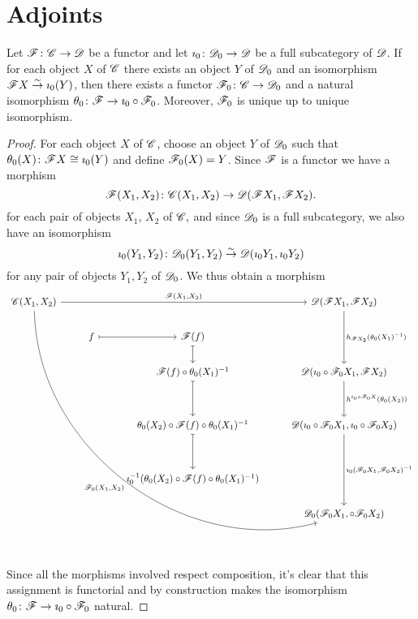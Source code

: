 \documentclass[10pt]{amsart}
\begin{document}
\section{Adjoints}

\begin{lem}\label{factorization}
  Let $\mathscr{F} \colon \mathscr{C} \to \mathscr{D}$ be a functor and let $\imath_0 \colon \mathscr{D}_0 \to \mathscr{D}$ be a full subcategory of $\mathscr{D}$.
  If for each object $X$ of $\mathscr{C}$ there exists an object $Y$ of $\mathscr{D}_0$ and an isomorphism $\mathscr{F} X \overset{\sim}\to \imath_0(Y)$, then there exists a functor $\mathscr{F}_0 \colon \mathscr{C} \to \mathscr{D}_0$ and a natural isomorphism $\theta_0 \colon \mathscr{F} \to \imath_0 \circ \mathscr{F}_0$.
  Moreover, $\mathscr{F}_0$ is unique up to unique isomorphism.
  
  \begin{proof}
    For each object $X$ of $\mathscr{C}$, choose an object $Y$ of $\mathscr{D}_0$ such that $\theta_0(X) \colon \mathscr{F} X \cong \imath_0(Y)$ and define $\mathscr{F}_0(X) = Y$.
    Since $\mathscr{F}$ is a functor we have a morphism 
    $$\mathscr{F}(X_1,X_2) \colon \mathscr{C}(X_1,X_2) \to \mathscr{D}(\mathscr{F} X_1, \mathscr{F} X_2).$$
    for each pair of objects $X_1$, $X_2$ of $\mathscr{C},$
    and since $\mathscr{D}_0$ is a full subcategory, we also have an isomorphism
    $$\imath_0(Y_1,Y_2) \colon \mathscr{D}_0(Y_1, Y_2) \overset{\sim}\to \mathscr{D}(\imath_0 Y_1, \imath_0 Y_2)$$
    for any pair of objects $Y_1, Y_2$ of $\mathscr{D}_0$.
    We thus obtain a morphism
    $$\begin{tikzcd}
      \C(X_1, X_2) \arrow[swap,bend right=52]{dddddddrrr}{\F_0(X_1,X_2)}\arrow{rrr}{\F(X_1,X_2)} & & & \D(\F X_1, \F X_2) \arrow{dd}{h_{\F X_2}(\theta_0(X_1)^{-1})}\\
      & f \arrow[mapsto]{r} & \F(f)\arrow[mapsto]{d}\\
      & & \F(f) \circ \theta_0(X_1)^{-1}\arrow[mapsto]{dd}& \D(\imath_0 \circ \F_0 X_1, \F X_2) \arrow{dd}{h^{i_0\circ \F_0 X}(\theta_0(X_2))}\\
      \\
      & & \theta_0(X_2) \circ \F(f) \circ \theta_0(X_1)^{-1} \arrow[mapsto]{dd}& \D(\imath_0 \circ \F_0 X_1, \imath_0 \circ \F_0 X_2)\arrow{ddd}{\imath_0(\F_0 X_1, \F_0 X_2)^{-1}}\\
      \\
      & & \imath_0^{-1}(\theta_0(X_2) \circ \F(f) \circ \theta_0(X_1)^{-1})\\
      & & & \D_0(\F_0 X_1, \circ \F_0 X_2)
    \end{tikzcd}$$
    Since all the morphisms involved respect composition, it's clear that this assignment is functorial and by construction makes the isomorphism $\theta_0 \colon \mathscr{F} \to \imath_0 \circ \mathscr{F}_0$ natural.


\end{proof}
\end{lem}
\end{document}
